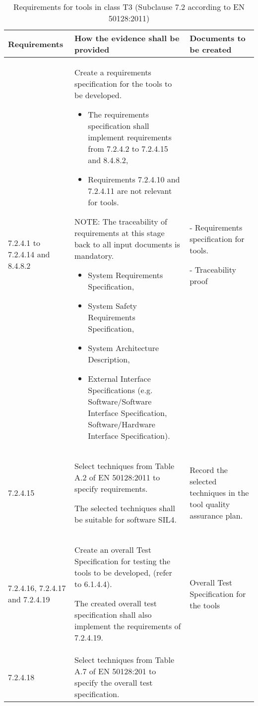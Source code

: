 \documentclass{template/openetcs_report}
\begin{document}
{\footnotesize\sffamily\centering
\begin{longtable}{|p{2cm}|p{9cm}|p{3cm}|}
\caption{Requirements for tools in class T3 (Subclause 7.2 according to EN 50128:2011)}\\
\hline
\bfseries Requirements & \bfseries How the evidence shall be provided & \bfseries Documents to be created\\
\hline
\hline
\endhead
\hline
\endfoot

7.2.4.1 to 7.2.4.14 and 8.4.8.2 & Create a requirements specification for the tools to be developed.
\begin{itemize}\itemsep=0pt
  \item The requirements specification shall implement requirements from 7.2.4.2 to 7.2.4.15 and 8.4.8.2,
  \item Requirements 7.2.4.10 and 7.2.4.11 are not relevant for tools. 
\end{itemize}

NOTE: \linebreak
The traceability of requirements at this stage back to all input documents is mandatory.
\begin{itemize}\itemsep=0pt
  \item System Requirements Specification,
  \item System Safety Requirements Specification,
  \item System Architecture Description,
  \item External Interface Specifications (e.g. Software/Software Interface Specification, Software/Hardware Interface Specification).
\end{itemize}
& - Requirements specification for tools.

- Traceability proof\\ 
\hline
7.2.4.15 & Select techniques from Table A.2 of EN 50128:2011 to specify requirements. 

The selected techniques shall be suitable for software SIL4.
& Record the selected techniques in the tool quality assurance plan.\\ 
\hline
7.2.4.16, 7.2.4.17 and 7.2.4.19 & Create an overall Test Specification for testing the tools to be developed, (refer to 6.1.4.4).

The created overall test specification shall also implement the requirements of 7.2.4.19.
& Overall Test Specification for the tools\\ 
\hline
7.2.4.18 & Select techniques from Table A.7 of EN 50128:201 to specify the overall test specification.


\end{longtable}}
\end{document}
